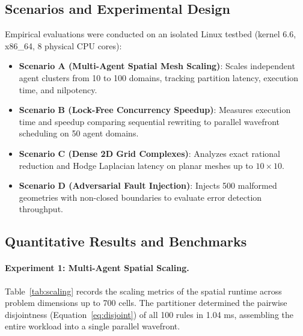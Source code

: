 \documentclass[10pt,a4paper]{article}
\begin{document}
\subsection{Scenarios and Experimental Design}
Empirical evaluations were conducted on an isolated Linux testbed (kernel 6.6, x86\_64, 8 physical CPU cores):
\begin{itemize}
    \item \textbf{Scenario A (Multi-Agent Spatial Mesh Scaling)}: Scales independent agent clusters from 10 to 100 domains, tracking partition latency, execution time, and nilpotency.
    \item \textbf{Scenario B (Lock-Free Concurrency Speedup)}: Measures execution time and speedup comparing sequential rewriting to parallel wavefront scheduling on 50 agent domains.
    \item \textbf{Scenario C (Dense 2D Grid Complexes)}: Analyzes exact rational reduction and Hodge Laplacian latency on planar meshes up to $10 \times 10$.
    \item \textbf{Scenario D (Adversarial Fault Injection)}: Injects 500 malformed geometries with non-closed boundaries to evaluate error detection throughput.
\end{itemize}

\subsection{Quantitative Results and Benchmarks}

\paragraph{Experiment 1: Multi-Agent Spatial Scaling.}
Table~\ref{tab:scaling} records the scaling metrics of the spatial runtime across problem dimensions up to 700 cells. The partitioner determined the pairwise disjointness (Equation~\ref{eq:disjoint}) of all 100 rules in 1.04 ms, assembling the entire workload into a single parallel wavefront.

\begin{table}[ht]
\centering
\caption{Multi-agent spatial scaling metrics across increasing problem dimensions.}
\label{tab:scaling}
\vspace{0.4em}
\end{table}
\end{document}
